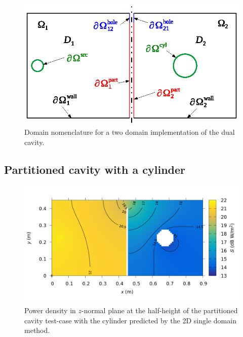 \documentclass[a4paper]{article}
\numberwithin{equation}{section}
\begin{document}
\begin{figure}[ht]
\begin{center}
\includegraphics[width=0.6\linewidth]{figures/domains2}
\vspace{-4mm}
\caption{\label{fg:tcdom2} Domain nomenclature for a two domain implementation of the dual cavity.}
\end{center}
\end{figure}

\subsection[Partitioned cavity with a cylinder]{Partitioned cavity with a cylinder}
\label{sc:tcs:cylpart}

\begin{figure}[ht]
\begin{center}
\includegraphics[width=0.8\linewidth]{figures/2D_SDM_w_map}
\vspace{-4mm}
\caption{\label{fg:dcsdmpd} Power density in $z$-normal plane at the half-height of the partitioned cavity test-case with the cylinder predicted by the 2D single domain method.}
\end{center}
\end{figure}


%

\end{document}
